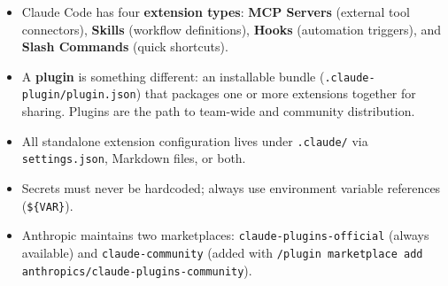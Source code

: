 \begin{summarybox}
\begin{itemize}
  \item Claude Code has four \textbf{extension types}: \textbf{MCP Servers}
        (external tool connectors), \textbf{Skills} (workflow definitions),
        \textbf{Hooks} (automation triggers), and \textbf{Slash Commands}
        (quick shortcuts).
  \item A \textbf{plugin} is something different: an installable bundle
        (\texttt{.claude-plugin/plugin.json}) that packages one or more
        extensions together for sharing. Plugins are the path to team-wide
        and community distribution.
  \item All standalone extension configuration lives under
        \texttt{.claude/} via \texttt{settings.json}, Markdown files, or
        both.
  \item Secrets must never be hardcoded; always use environment variable
        references (\texttt{\$\{VAR\}}).
  \item Anthropic maintains two marketplaces:
        \texttt{claude-plugins-official} (always available) and
        \texttt{claude-community} (added with
        \texttt{/plugin marketplace add anthropics/claude-plugins-community}).
\end{itemize}
\end{summarybox}

\nocite{*}
\printbibliography[heading=subbibliography,title={References}]
